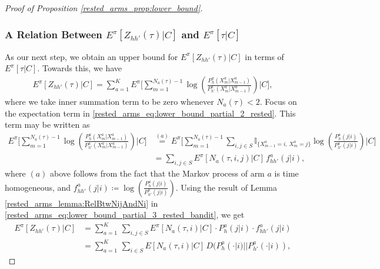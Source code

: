 \begin{proof}[Proof of Proposition \ref{rested_arms_prop:lower_bound}]
\subsubsection{A Relation Between $E^\pi[Z_{hh'}(\tau)|C]$ and $E^\pi[\tau|C]$}
 As our next step, we obtain an upper bound for $E^\pi[Z_{hh'}(\tau)|C]$ in terms of $E^\pi[\tau|C]$. Towards this, we have
\begingroup\allowdisplaybreaks\begin{align}
{E}^\pi[Z_{hh'}(\tau)|C]
=\sum\limits_{a=1}^{K}{E}^\pi\bigg[\sum\limits_{m=1}^{N_{a}(\tau)-1}\log\left(\frac{P_{h}^{a}(X_{m}^{a}|X_{m-1}^{a})}{P_{h'}^{a}(X_{m}^{a}|X_{m-1}^{a})}\right)\bigg\vert C\bigg],\label{rested_arms_eq:lower_bound_partial_2_rested}
\end{align}\endgroup
where we take inner summation term to be zero whenever $N_a(\tau)<2$.
Focus on the expectation term in \eqref{rested_arms_eq:lower_bound_partial_2_rested}.
This term may be written as
\begingroup\allowdisplaybreaks\begin{align}
E^\pi\bigg[\sum\limits_{m=1}^{N_{a}(\tau)-1}\log\left(\frac{P_{h}^{a}(X_{m}^{a}|X_{m-1}^{a})}{P_{h'}^{a}(X_{m}^{a}|X_{m-1}^{a})}\right)\bigg\vert C\bigg]
&\stackrel{(a)}{=}E^\pi\bigg[\sum\limits_{m=1}^{N_{a}(\tau)-1}\sum\limits_{i,j\in S}\mathbb{I}_{\{X_{m-1}^a=i,\,X_m^a=j\}}\log\left(\frac{P_{h}^{a}(j|i)}{P_{h'}^{a}(j|i)}\right)\bigg\vert C\bigg]\nonumber\\
&=\sum\limits_{i,j\in S}E^\pi[N_a(\tau,i,j)|C]\,f^a_{hh'}(j|i),\label{rested_arms_eq:lower_bound_partial_3_rested_bandit}
\end{align}\endgroup
where $(a)$ above follows from the fact that the Markov process of arm $a$ is time homogeneous, and $f_{hh'}^a(j|i)\coloneqq\log\left(\frac{P_{h}^{a}(j|i)}{P_{h'}^{a}(j|i)}\right)$. Using the result of Lemma \ref{rested_arms_lemma:RelBtwNijAndNi} in \eqref{rested_arms_eq:lower_bound_partial_3_rested_bandit}, we get
\begingroup\allowdisplaybreaks\begin{align}
E^\pi[Z_{hh'}(\tau)|C]
&=\sum\limits_{a=1}^{K}\,\sum\limits_{i,j\in S}{E}^\pi[N_a(\tau,i)|C]\cdot P_{h}^a(j|i)\cdot f^a_{hh'}(j|i)\nonumber\\
&=\sum\limits_{a=1}^{K}\,\sum\limits_{i\in S}{E}[N_a(\tau,i)|C]\,D(P_h^a(\cdot|i)||P_{h'}^a(\cdot|i)),\label{rested_arms_eq:lower_bound_partial_6_rested_arms}

\end{align}
\end{proof}

